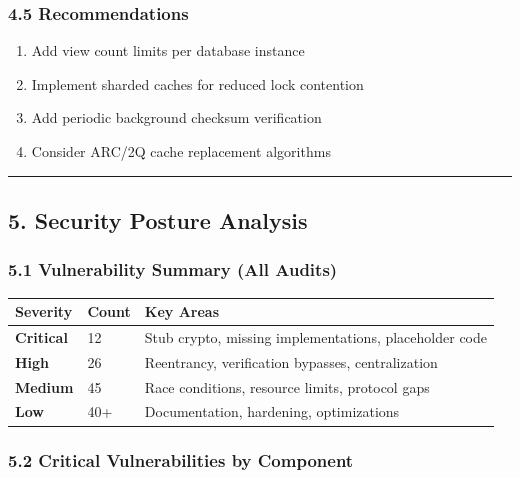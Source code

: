 \documentclass[
]{article}
\newcounter{none} %
\providecommand{\tightlist}{%
  \setlength{\itemsep}{0pt}\setlength{\parskip}{0pt}}
\begin{document}
\subsubsection{4.5 Recommendations}\label{45-recommendations}

\begin{enumerate}
\def\labelenumi{\arabic{enumi}.}
\tightlist
\item
  Add view count limits per database instance
\item
  Implement sharded caches for reduced lock contention
\item
  Add periodic background checksum verification
\item
  Consider ARC/2Q cache replacement algorithms
\end{enumerate}

\begin{center}\rule{0.5\linewidth}{0.5pt}\end{center}

\subsection{5. Security Posture
Analysis}\label{5-security-posture-analysis}

\subsubsection{5.1 Vulnerability Summary (All
Audits)}\label{51-vulnerability-summary-all-audits}

{\def\LTcaptype{none} %
\begin{longtable}[]{@{}lll@{}}
\toprule\noalign{}
Severity & Count & Key Areas \\
\midrule\noalign{}
\endhead
\bottomrule\noalign{}
\endlastfoot
\textbf{Critical} & 12 & Stub crypto, missing implementations,
placeholder code \\
\textbf{High} & 26 & Reentrancy, verification bypasses,
centralization \\
\textbf{Medium} & 45 & Race conditions, resource limits, protocol
gaps \\
\textbf{Low} & 40+ & Documentation, hardening, optimizations \\
\end{longtable}
}

\subsubsection{5.2 Critical Vulnerabilities by
Component}\label{52-critical-vulnerabilities-by-component}
\end{document}

